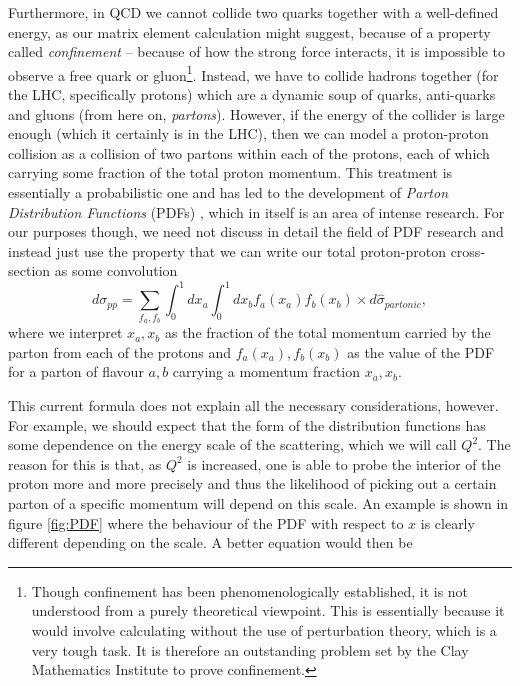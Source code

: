 Furthermore, in QCD we cannot collide two quarks together with a well-defined energy, as our matrix element calculation might suggest, because of a property called \emph{confinement} -- because of how the strong force interacts, it is impossible to observe a free quark or gluon\footnote{Though confinement has been phenomenologically established, it is not understood from a purely theoretical viewpoint. This is essentially because it would involve calculating without the use of perturbation theory, which is a very tough task. It is therefore an outstanding problem set by the Clay Mathematics Institute to prove confinement.}. Instead, we have to collide hadrons together (for the LHC, specifically protons) which are a dynamic soup of quarks, anti-quarks and gluons (from here on, \emph{partons}). However, if the energy of the collider is large enough (which it certainly is in the LHC), then we can model a proton-proton collision as a collision of two partons within each of the protons, each of which carrying some fraction of the total proton momentum. This treatment is essentially a probabilistic one and has led to the development of \emph{Parton Distribution Functions} (PDFs) \cite{Soper1997}, which in itself is an area of intense research. For our purposes though, we need not discuss in detail the field of PDF research and instead just use the property that we can write our total proton-proton cross-section as some convolution
\begin{equation}
d \sigma_{pp} = \sum_{f_a, f_b} \int_0^1 dx_a \int_0^1 dx_b f_a(x_a) f_b(x_b) \times d\hat{\sigma}_{partonic},
\end{equation}
where we interpret $x_a, x_b$ as the fraction of the total momentum carried by the parton from each of the protons and $f_a (x_a), f_b(x_b)$ as the value of the PDF for a parton of flavour $a,b$ carrying a momentum fraction $x_a, x_b$. 

This current formula does not explain all the necessary considerations, however. For example, we should expect that the form of the distribution functions has some dependence on the energy scale of the scattering, which we will call $Q^2$. The reason for this is that, as $Q^2$ is increased, one is able to probe the interior of the proton more and more precisely and thus the likelihood of picking out a certain parton of a specific momentum will depend on this scale. An example is shown in figure \ref{fig:PDF} where the behaviour of the PDF with respect to $x$ is clearly different depending on the scale. A better equation would then be

